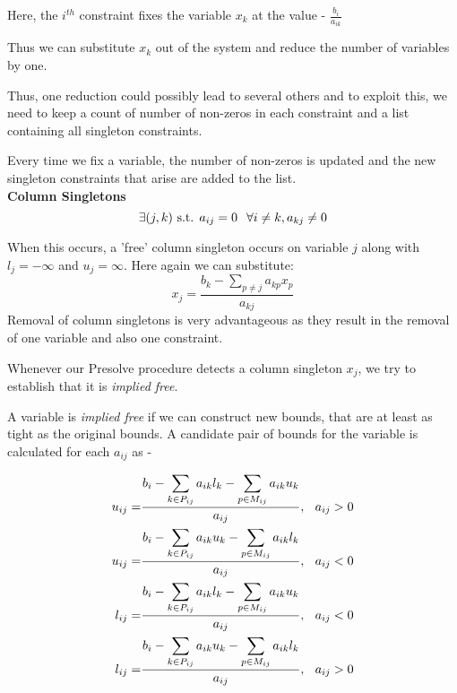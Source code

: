 \documentclass[twoside]{article}
\begin{document}
\begin{multicols}{2}
   Here, the $i^{th}$ constraint fixes the variable $x_k$ at the value - $\frac{b_i}{a_{ik}}$
    
    Thus we can substitute $x_k$ out of the system and reduce the number of variables by one.
    
    Thus, one reduction could possibly lead to several others and to exploit this, we need to keep a count of number of non-zeros in each constraint and a list containing all singleton constraints.
    
    Every time we fix a variable, the number of non-zeros is updated and the new singleton constraints that arise are added to the list. \\\textbf{\color{blue}Column Singletons}
    \begin{equation*}
     \exists (j,k) \text{ s.t. }  a_{ij} = 0 \hspace{0.1in} \forall i \neq k, a_{kj} \neq 0   
    \end{equation*}
   
    When this occurs, a 'free' column singleton occurs on variable $j$ along with $l_j = -\infty$ and $u_j = \infty$. Here again we can substitute:
    \begin{equation*}
     x_j = \frac{b_k - \displaystyle\sum_{p \neq j} a_{kp}x_p}{a_{kj}}   
    \end{equation*}
    Removal of column singletons is very advantageous as they result in the removal of one variable and also one constraint.

	Whenever our Presolve procedure detects a column singleton $x_j$, we try to establish that it is \emph{implied free}. 
	
	A variable is \emph{implied free} if we can construct new bounds, that are at least as tight as the original bounds. A candidate pair of bounds for the variable is calculated for each $a_{ij}$ as - 
	
	\begin{align*}
	u_{ij} = & \frac{b_i - \displaystyle\sum_{k \in P_{ij} } a_{ik}l_k - \displaystyle\sum_{p \in M_{ij}} a_{ik}u_k }{a_{ij}},\hspace{0.1in}  a_{ij} > 0 \\
	u_{ij} = & \frac{b_i - \displaystyle\sum_{k \in P_{ij} } a_{ik}u_k - \displaystyle\sum_{p \in M_{ij}} a_{ik}l_k }{a_{ij}},\hspace{0.1in}  a_{ij} < 0 \\		
	l_{ij} = & \frac{b_i - \displaystyle\sum_{k \in P_{ij} } a_{ik}l_k - \displaystyle\sum_{p \in M_{ij}} a_{ik}u_k }{a_{ij}},\hspace{0.1in}  a_{ij} < 0 \\
	l_{ij} = & \frac{b_i - \displaystyle\sum_{k \in P_{ij} } a_{ik}u_k -\displaystyle \sum_{p \in M_{ij}} a_{ik}l_k }{a_{ij}},\hspace{0.1in}  a_{ij} > 0 
	\end{align*}
	

\end{multicols}
\end{document}
